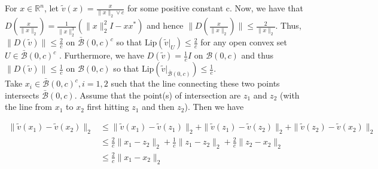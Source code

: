 \documentclass[11pt]{article}
\newcommand{\<}{\langle}
\renewcommand{\>}{\rangle}
\numberwithin{equation}{section}
\newcommand{\lip}{\text{Lip}}
\begin{document}
For $x \in \mathbb{R}^n$, let $\tilde{v}(x) = \frac{x}{\|x\|_2 \vee c}$ for some positive constant c. Now, we have that $D(\frac{x}{\|x\|_2}) = \frac{1}{\|x\|_2^3}(\|x\|_2^2I - xx^*)$ and hence $\|D(\frac{x}{\|x\|_2})\| \leq \frac{2}{\|x\|_2}$. Thus, $\|D(\tilde{v})\| \leq \frac{2}{c}$ on $\bar{\mathcal{B}}(0,c)^{c}$ so that $\lip(\tilde{v}|_{U}) \leq \frac{2}{c}$ for any open convex set $U \in \bar{\mathcal{B}}(0,c)^{c}$ . Furthermore, we have $D(\tilde{v}) = \frac{1}{c}I$ on $\mathcal{B}(0,c)$ and thus $\|D(\tilde{v})\| \leq \frac{1}{c}$ on $\mathcal{B}(0,c)$ so that $\lip(\tilde{v}|_{\bar{\mathcal{B}}(0,c)}) \leq \frac{1}{c}$.\\

Take $x_i \in \bar{\mathcal{B}}(0,c)^c, i = 1,2$ such that the line connecting these two points intersects $\bar{\mathcal{B}}(0,c)$. Assume that the point(s) of intersection are $z_1$ and $z_2$ (with the line from $x_1$ to $x_2$ first hitting $z_1$ and then $z_2$).  Then we have 

\begin{align*}
\|\tilde{v}(x_1) - \tilde{v}(x_2)\|_2 &\leq \|\tilde{v}(x_1) - \tilde{v}(z_1)\|_2+\|\tilde{v}(z_1) - \tilde{v}(z_2)\|_2+\|\tilde{v}(z_2) - \tilde{v}(x_2)\|_2\\
& \leq \frac{2}{c} \|x_1 - z_2\|_2 + \frac{1}{c}\|z_1-z_2\|_2 + \frac{2}{c}\|z_2 - x_2 \|_2\\
& \leq \frac{2}{c}\|x_1-x_2\|_2
\end{align*}
\end{document}
